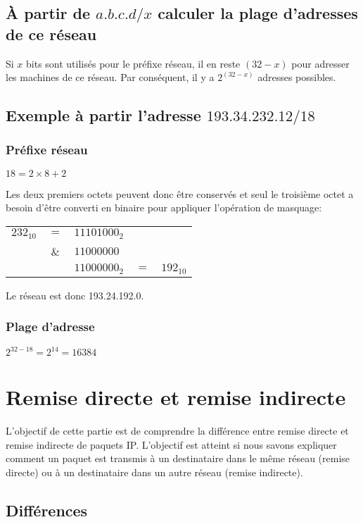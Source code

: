 \documentclass[11pt,a4paper]{article}
\begin{document}
\subsection{À partir de $a.b.c.d/x$ calculer la plage d'adresses de ce réseau}

Si $x$ bits sont utilisés pour le préfixe réseau, il en reste $(32-x)$ pour adresser les machines de ce réseau. Par conséquent, il y a $2^{(32-x)}$ adresses possibles.

\subsection{Exemple à partir l'adresse $193.34.232.12/18$}

\subsubsection*{Préfixe réseau}

$18 = 2 \times 8 + 2$

Les deux premiers octets peuvent donc être conservés et seul le troisième octet a besoin d'être converti en binaire pour appliquer l'opération de masquage:

\begin{tabular}{rclcl}
	$232_{10}$ & $=$ & $1110 1000_2$ \\
	& \& & $1100 0000$ \\
	\hline
	& & $1100 0000_2$ & $=$ & $192_{10}$
\end{tabular}

Le réseau est donc 193.24.192.0.

\subsubsection*{Plage d'adresse}

$2^{32-18} = 2^{14} = 16384$

\section{Remise directe et remise indirecte}

L'objectif de cette partie est de comprendre la différence entre remise directe et remise indirecte de paquets IP. L'objectif est atteint si nous savons expliquer comment un paquet est transmis à un destinataire dans le même réseau (remise directe) ou à un destinataire dans un autre réseau (remise indirecte).

\subsection{Différences}
\end{document}
